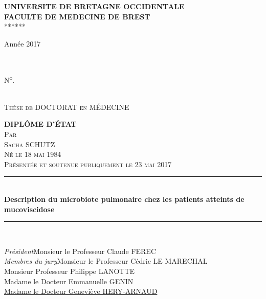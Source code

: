 \documentclass[12pt,a4paper]{article}
\newcommand{\HRule}{\rule{\linewidth}{0.5mm}} %
\begin{document}
\begin{titlepage}
\centering
\Large \textbf{UNIVERSITE DE BRETAGNE OCCIDENTALE \\
FACULTE DE MEDECINE DE BREST}\\
******


\begin{minipage}{0.4\textwidth}
 \begin{flushleft} \large
     Année 2017
 \end{flushleft}
\end{minipage}
~
\begin{minipage}{0.5\textwidth}
 \begin{flushright} \large
    N\textsuperscript{o}.
 \end{flushright}
\end{minipage}\\[0.2cm]
\center
\textsc{\large Thèse de DOCTORAT en MÉDECINE }


\textsc{\Large \textbf{DIPLÔME D'ÉTAT}}\\[0.1cm]
\textsc{\large Par}\\[0.1cm]
\textsc{\Large Sacha SCHUTZ} \\[0.1cm]
\textsc{\normalsize Né le 18 mai 1984} \\[0.1cm]
\textsc{\normalsize Présentée et soutenue publiquement le 23 mai 2017}\\[1.0cm]


\HRule \\[0.5cm]

{ \huge \bfseries Description du microbiote pulmonaire chez les patients atteints de mucoviscidose}\\[0.4cm]

\HRule \\[3.5cm]

 \begin{flushleft} \large
      \emph{Président}\hspace{2.89cm}Monsieur le Professeur Claude FEREC\\[0.4cm]
      \emph{Membres du jury}\hspace{1.3cm}Monsieur le Professeur Cédric LE MARECHAL\\
       \hspace*{5cm}Monsieur Professeur Philippe LANOTTE\\
       \hspace*{5cm}Madame le Docteur Emmanuelle GENIN\\
       \hspace*{5cm}\underline{Madame le Docteur Geneviève HERY-ARNAUD} \\
\end{flushleft}


\vfill %
\restoregeometry
\end{titlepage}
\end{document}
